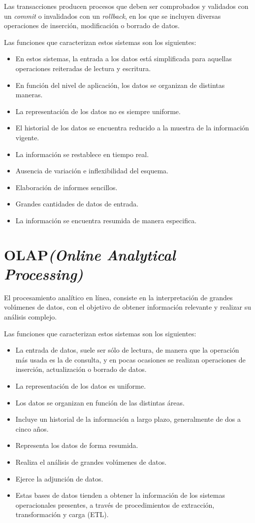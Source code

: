 Las transacciones producen procesos que deben ser comprobados y validados con un \emph{commit} o invalidados con un \emph{rollback}, en los que se incluyen diversas operaciones de inserción, modificación o borrado de datos.

Las funciones que caracterizan estos sistemas son los siguientes:
\begin{itemize}
	\item En estos sistemas, la entrada a los datos está simplificada para aquellas operaciones reiteradas de lectura y escritura.
	\item En función del nivel de aplicación, los datos se organizan de distintas maneras.
	\item La representación de los datos no es siempre uniforme.
	\item El historial de los datos se encuentra reducido a la muestra de la información vigente.
	\item La información se restablece en tiempo real.
	\item Ausencia de variación e inflexibilidad del esquema.
	\item Elaboración de informes sencillos.
	\item Grandes cantidades de datos de entrada.
	\item La información se encuentra resumida de manera especifica.
\end{itemize}

\section{OLAP\emph{(Online Analytical Processing)}}
El procesamiento analítico en línea, consiste en la interpretación de grandes volúmenes de datos, con el objetivo de obtener información relevante y realizar su análisis complejo.

Las funciones que caracterizan estos sistemas son los siguientes:

\begin{itemize}
	\item La entrada de datos, suele ser sólo de lectura, de manera que la operación más usada es la de consulta, y en pocas ocasiones se realizan operaciones de inserción, actualización o borrado de datos.
	\item La representación de los datos es uniforme.
	\item Los datos se organizan en función de las distintas áreas.
	\item Incluye un historial de la información a largo plazo, generalmente de dos a cinco años.
	\item Representa los datos de forma resumida.
	\item Realiza el análisis de grandes volúmenes de datos.
	\item Ejerce la adjunción de datos.
	\item Estas bases de datos tienden a obtener la información de los sistemas operacionales presentes, a través de procedimientos de extracción, transformación y carga (ETL). 
\end{itemize}
